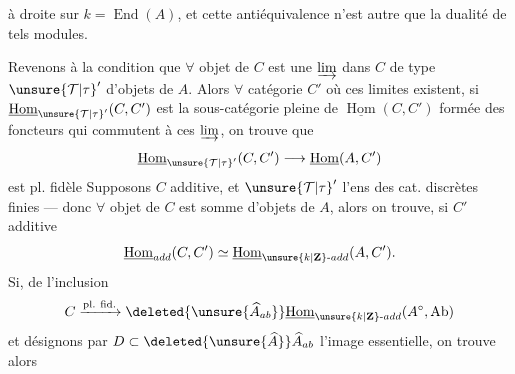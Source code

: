 à droite sur $k=\operatorname{End}(A)$, et cette
antiéquivalence n'est autre que la
dualité de tels modules.

Revenons à la  condition que
$\forall$ objet de $C$ est une $\varinjlim$ dans $C$
de type $\unsure{\mathcal{T}|\tau}'$ d'objets de $A$. Alors
$\forall$ catégorie $C'$ où ces limites existent,
si $\underline{\operatorname{Hom}}_{\unsure{\mathcal{T}|\tau}'}(C,C')$ est la sous-catégorie
pleine de $\underline{\operatorname{Hom}}(C,C')$ formée des
foncteurs qui commutent à ces
$\varinjlim$, on trouve que
\[
\underline{\operatorname{Hom}}_{\unsure{\mathcal{T}|\tau}'}(C,C')\longrightarrow
\underline{\operatorname{Hom}}(A,C')
\]
est pl. fidèle 
Supposons $C$ additive, et $\unsure{\mathcal{T}|\tau}'$ l'ens
des cat. discrètes finies --- donc
$\forall$ objet de $C$ est somme d'objets
de $A$, alors on trouve, si $C'$ additive
\[
\underline{\operatorname{Hom}}_{add}(C,C')\simeq
\underline{\operatorname{Hom}}_{\unsure{k|\mathbf Z}\text{-}add}(A,C').
\]
Si,  de l'inclusion
\[
C\xrightarrow{\mathrm{pl.\ fid.}}\deleted{\unsure{\widehat A_{ab}}}
\underline{\operatorname{Hom}}_{\unsure{k|\mathbf Z}\text{-}add}(A^\circ,\mathrm{Ab})
\]
et désignons par $D\subset\deleted{\unsure{\widehat A}}\widehat A_{ab}$ l'image
essentielle, on trouve alors
